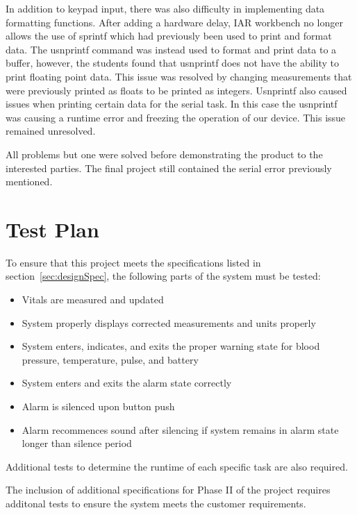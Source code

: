 \documentclass[12pt]{article} %
\begin{document}
    In addition to keypad input, there was also difficulty in implementing data
    formatting functions. After adding a hardware delay, IAR workbench no
    longer allows the use of sprintf which had previously been used to print
    and format data. The usnprintf command was instead used to format and print
    data to a buffer, however, the students found that usnprintf does not have
    the ability to print floating point data. This issue was resolved by
    changing measurements that were previously printed as floats to be printed
    as integers. Usnprintf also caused issues when printing certain data for
    the serial task. In this case the usnprintf was causing a runtime error and
    freezing the operation of our device. This issue remained unresolved. 
    
    
    
    
    All problems but one were solved before demonstrating the product to the interested
    parties. The final project still contained the serial error previously mentioned.
    
    \section{Test Plan} 

    To ensure that this project meets the specifications listed in 
    section~\ref{sec:designSpec}, the following parts of the system must be 
    tested: 

    \begin{itemize}
      \item Vitals are measured and updated
      \item System properly displays corrected measurements and units properly
      \item System enters, indicates, and exits the proper warning state for
	blood pressure, temperature, pulse, and battery
      \item System enters and exits the alarm state correctly
      \item Alarm is silenced upon button push
      \item Alarm recommences sound after silencing if system remains in alarm
	state longer than silence period
    \end{itemize}

    Additional tests to determine the runtime of each specific task are also
    required.

    The inclusion of additional specifications for Phase II of the project
    requires additonal tests to ensure the system meets the customer
    requirements.
\end{document}
